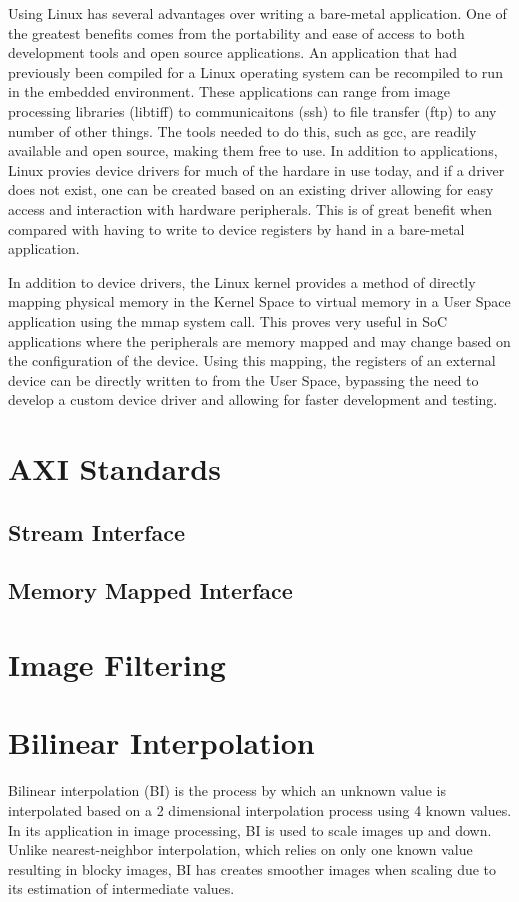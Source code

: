 Using Linux has several advantages over writing a bare-metal application.  One of the greatest benefits comes from the portability and ease of access to both development tools and open source applications.  An application that had previously been compiled for a Linux operating system can be recompiled to run in the embedded environment.  These applications can range from image processing libraries (libtiff) to communicaitons (ssh) to file transfer (ftp) to any number of other things.  The tools needed to do this, such as gcc, are readily available and open source, making them free to use.  In addition to applications, Linux provies device drivers for much of the hardare in use today, and if a driver does not exist, one can be created based on an existing driver allowing for easy access and interaction with hardware peripherals.  This is of great benefit when compared with having to write to device registers by hand in a bare-metal application.

In addition to device drivers, the Linux kernel provides a method of directly mapping physical memory in the Kernel Space to virtual memory in a User Space application using the mmap system call.  This proves very useful in SoC applications where the peripherals are memory mapped and may change based on the configuration of the device.  Using this mapping, the registers of an external device can be directly written to from the User Space, bypassing the need to develop a custom device driver and allowing for faster development and testing.

\section{AXI Standards}

\subsection{Stream Interface}

\subsection{Memory Mapped Interface}

\section{Image Filtering}

\section{Bilinear Interpolation}
Bilinear interpolation (BI) is the process by which an unknown value is interpolated based on a 2 dimensional interpolation process using 4 known values.  In its application in image processing, BI is used to scale images up and down.  Unlike nearest-neighbor interpolation, which relies on only one known value resulting in blocky images, BI has creates smoother images when scaling due to its estimation of intermediate values.

